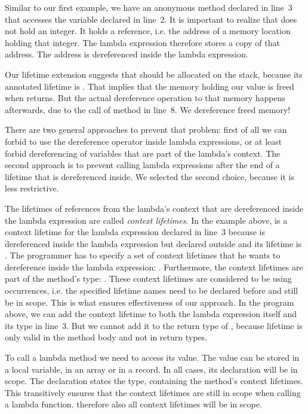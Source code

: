 Similar to our first example, we have an anonymous method declared in line~3 that accesses the variable  declared in line~2.
It is important to realize that  does not hold an integer.
It holds a reference, i.e. the address of a memory location holding that integer.
The lambda expression therefore stores a copy of that address.
The address is dereferenced inside the lambda expression.

Our lifetime extension suggests that  should be allocated on the stack, because its annotated lifetime is .
That implies that the memory holding our value  is freed when  returns.
But the actual dereference operation to that memory happens afterwards, due to the call of method  in line~8.
We dereference freed memory!

There are two general approaches to prevent that problem:
first of all we can forbid to use the dereference operator inside lambda expressions, or at least forbid dereferencing of variables that are part of the lambda's context.
The second approach is to prevent calling lambda expressions after the end of a lifetime that is dereferenced inside.
We selected the second choice, because it is less restrictive.

The lifetimes of references from the lambda's context that are dereferenced inside the lambda expression are called \emph{context lifetimes}.
In the example above,  is a context lifetime for the lambda expression declared in line~3 because  is dereferenced inside the lambda expression but declared outside and its lifetime is .
The programmer has to specify a set of context lifetimes that he wants to dereference inside the lambda expression: .
Furthermore, the context lifetimes are part of the method's type: .
These context lifetimes are considered to be using occurrences, i.e. the specified lifetime names need to be declared before and still be in scope.
This is what ensures effectiveness of our approach.
In the program above, we can add the context lifetime to both the lambda expression itself and its type in line~3.
But we cannot add it to the return type of , because lifetime  is only valid in the method body and not in return types.

To call a lambda method we need to access its value.
The value can be stored in a local variable, in an array or in a record.
In all cases, its declaration will be in scope.
The declaration states the type, containing the method's context lifetimes.
This transitively ensures that the context lifetimes are still in scope when calling a lambda function.
therefore also all context lifetimes will be in scope.

